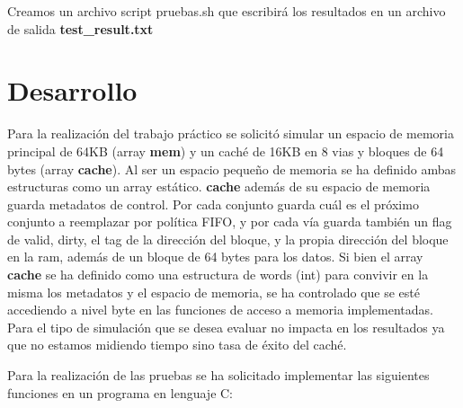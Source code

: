 \documentclass[a4paper, 10pt, twoside, notitlepage]{article}
\begin{document}
Creamos un archivo script pruebas.sh que escribirá los resultados en un archivo de salida \textbf{test\_result.txt} \\

\section{Desarrollo}
\normalsize

Para la realización del trabajo práctico se solicitó simular un espacio de memoria principal  de 64KB (array \textbf{mem}) y un caché de 16KB en 8 vias y bloques de 64 bytes (array \textbf{cache}).
Al ser un espacio pequeño de memoria se ha definido ambas estructuras como un array estático.
\textbf{cache} además de su espacio de memoria guarda metadatos de control. Por cada conjunto guarda cuál es el próximo conjunto a reemplazar por política FIFO, y por cada vía guarda también un flag de valid, dirty, el tag de la dirección del bloque, y la propia dirección del bloque en la ram, además de un bloque de 64 bytes para los datos. Si bien el array \textbf{cache} se ha definido como una estructura de words (int) para convivir en la misma los metadatos y el espacio de memoria, se ha controlado que se esté accediendo a nivel byte en las funciones de acceso a memoria implementadas. Para el tipo de simulación que se desea evaluar no impacta en los resultados ya que no estamos midiendo tiempo sino tasa de éxito del caché.

Para la realización de las pruebas se ha solicitado implementar las siguientes funciones en un programa en lenguaje C:
\end{document}
